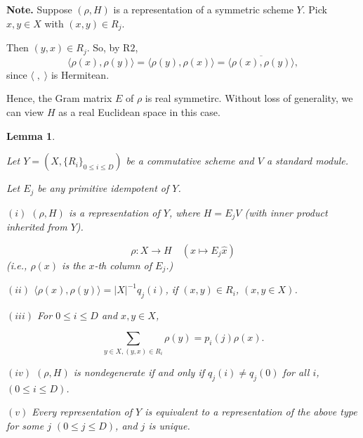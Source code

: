 \documentclass[
]{book}
\newtheorem{lemma}{Lemma}[chapter]
\theoremstyle{definition}
\theoremstyle{definition}
\theoremstyle{definition}
\theoremstyle{definition}
\theoremstyle{remark}
\begin{document}
\textbf{Note.}
Suppose \((\rho, H)\) is a representation of a symmetric scheme \(Y\). Pick \(x,y\in X\) with \((x,y)\in R_j\).

Then \((y,x)\in R_j\). So, by \(\mathrm{R2}\),
\[\langle \rho(x), \rho(y)\rangle = \langle \rho(y),\rho(x)\rangle = \overline{\langle \rho(x), \rho(y)\rangle},\]
since \(\langle \;, \;\rangle\) is Hermitean.

Hence, the Gram matrix \(E\) of \(\rho\) is real symmetirc. Without loss of generality, we can view \(H\) as a real Euclidean space in this case.

\begin{lemma}
\protect\hypertarget{lem:rep-of-scheme}{}\label{lem:rep-of-scheme}

Let \(Y = (X, \{R_i\}_{0\leq i\leq D})\) be a commutative scheme and \(V\) a standard module.

Let \(E_j\) be any primitive idempotent of \(Y\).

\((i)\) \((\rho, H)\) is a representation of \(Y\), where \(H = E_jV\) (with inner product inherited from \(Y\)).

\[\rho: X \to H \quad (x\mapsto E_j\hat{x})\]
(i.e., \(\rho(x)\) is the \(x\)-th column of \(E_j\).)

\((ii)\) \(\langle \rho(x),\rho(y)\rangle = |X|^{-1}q_j(i)\), if \((x,y)\in R_i\), \((x,y\in X)\).

\((iii)\) For \(0\leq i\leq D\) and \(x,y\in X\),

\[\sum_{y\in X, (y,x)\in R_i}\rho(y) = p_i(j)\rho(x).\]

\((iv)\) \((\rho,H)\) is nondegenerate if and only if \(q_j(i) \neq q_j(0)\) for all \(i\), \((0\leq i\leq D)\).

\((v)\) Every representation of \(Y\) is equivalent to a representation of the above type for some \(j\) \((0\leq j\leq D)\), and \(j\) is unique.

\end{lemma}
\end{document}
